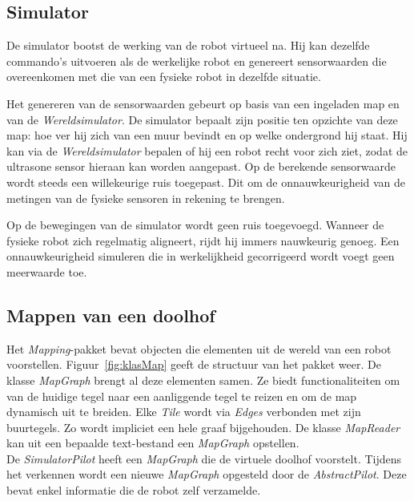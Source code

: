 \documentclass[eind]{penoverslag}
\begin{document}
\subsection{Simulator} 
\label{ssec:Sim}
De simulator bootst de werking van de robot virtueel na. Hij kan dezelfde commando's uitvoeren als de werkelijke robot en genereert sensorwaarden die overeenkomen met die van een fysieke robot in dezelfde situatie.

Het genereren van de sensorwaarden gebeurt op basis van een ingeladen map en van de \textit{Wereldsimulator}. De simulator bepaalt zijn positie ten opzichte van deze map: hoe ver hij zich van een muur bevindt en op welke ondergrond hij staat. Hij kan via de \textit{Wereldsimulator} bepalen of hij een robot recht voor zich ziet, zodat de ultrasone sensor hieraan kan worden aangepast. Op de berekende sensorwaarde wordt steeds een willekeurige ruis toegepast. Dit om de onnauwkeurigheid van de metingen van de fysieke sensoren in rekening te brengen.

Op de bewegingen van de simulator wordt geen ruis toegevoegd. Wanneer de fysieke robot zich regelmatig aligneert, rijdt hij immers nauwkeurig genoeg. Een onnauwkeurigheid simuleren die in werkelijkheid gecorrigeerd wordt voegt geen meerwaarde toe.

\subsection{Mappen van een doolhof}
\label{ssec:Mapping}
Het \textit{Mapping}-pakket bevat objecten die elementen uit de wereld van een robot voorstellen. Figuur~\ref{fig:klasMap} geeft de structuur van het pakket weer. De klasse \textit{MapGraph} brengt al deze elementen samen. Ze biedt functionaliteiten om van de huidige tegel naar een aanliggende tegel te reizen en om de map dynamisch uit te breiden. Elke \textit{Tile} wordt via \textit{Edges} verbonden met zijn buurtegels. Zo wordt impliciet een hele graaf bijgehouden. De klasse \textit{MapReader} kan uit een bepaalde text-bestand een \textit{MapGraph} opstellen.\\

De \textit{SimulatorPilot} heeft een \textit{MapGraph} die de virtuele doolhof voorstelt. Tijdens het verkennen wordt een nieuwe \textit{MapGraph} opgesteld door de \textit{AbstractPilot}. Deze bevat enkel informatie die de robot zelf verzamelde.

\end{document}
